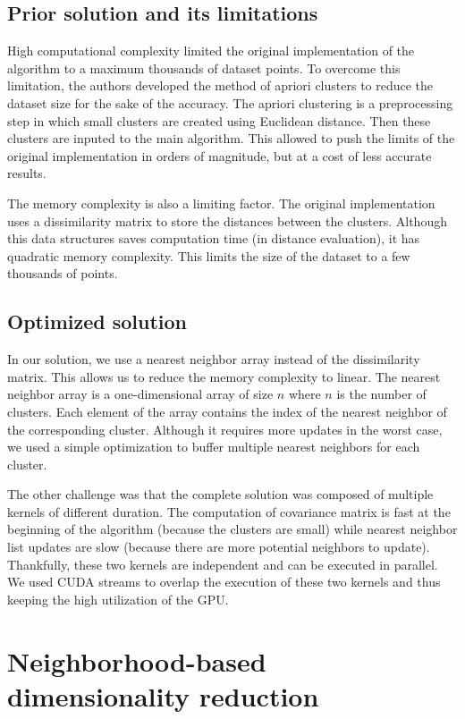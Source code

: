 \subsection{Prior solution and its limitations}

High computational complexity limited the original implementation of the algorithm to a maximum thousands of dataset points. To overcome this limitation, the authors developed the method of apriori clusters to reduce the dataset size for the sake of the accuracy. The apriori clustering is a preprocessing step in which small clusters are created using Euclidean distance. Then these clusters are inputed to the main algorithm. This allowed to push the limits of the original implementation in orders of magnitude, but at a cost of less accurate results.

The memory complexity is also a limiting factor. The original implementation uses a dissimilarity matrix to store the distances between the clusters. Although this data structures saves computation time (in distance evaluation), it has quadratic memory complexity. This limits the size of the dataset to a few thousands of points.

\subsection{Optimized solution}

In our solution, we use a nearest neighbor array instead of the dissimilarity matrix. This allows us to reduce the memory complexity to linear. The nearest neighbor array is a one-dimensional array of size $n$ where $n$ is the number of clusters. Each element of the array contains the index of the nearest neighbor of the corresponding cluster. Although it requires more updates in the worst case, we used a simple optimization to buffer multiple nearest neighbors for each cluster.

The other challenge was that the complete solution was composed of multiple kernels of different duration. The computation of covariance matrix is fast at the beginning of the algorithm (because the clusters are small) while nearest neighbor list updates are slow (because there are more potential neighbors to update). Thankfully, these two kernels are independent and can be executed in parallel. We used CUDA streams to overlap the execution of these two kernels and thus keeping the high utilization of the GPU.

\section{Neighborhood-based dimensionality reduction}

